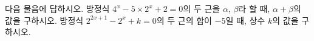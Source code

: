 다음 물음에 답하시오.
 방정식 $4^x-5\times 2^x+2=0$의 두 근을 $\alpha$, $\beta$라 할 때, $\alpha+\beta$의 값을 구하시오.
 방정식 $2^{2x+1}-2^x+k=0$의 두 근의 합이 $-5$일 때, 상수 $k$의 값을 구하시오.
